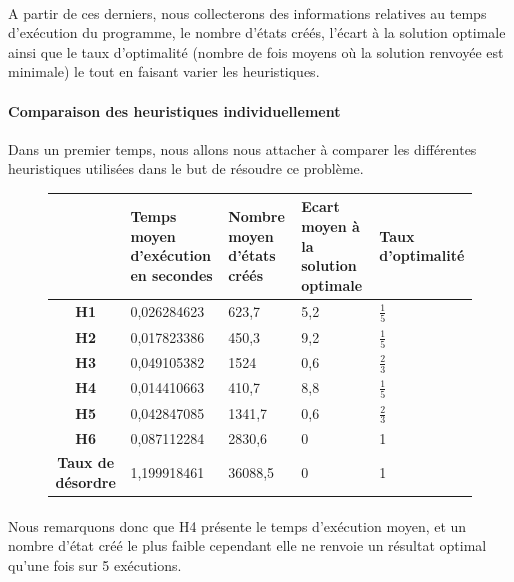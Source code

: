 \documentclass[10pt,a4paper]{report}
\begin{document}
\paragraph{}{A partir de ces derniers, nous collecterons des informations relatives au temps d'exécution du programme, le nombre d'états créés, l'écart à la solution optimale ainsi que le taux d'optimalité (nombre de fois moyens où la solution renvoyée est minimale) le tout en faisant varier les heuristiques.}
\paragraph{Comparaison des heuristiques individuellement}{Dans un premier temps, nous allons nous attacher à comparer les différentes heuristiques utilisées dans le but de résoudre ce problème.}
{\scriptsize{}
\renewcommand{\arraystretch}{1.3}
\vspace*{1cm}
\begin{figure}[h!]
\centering
\begin{tabular}
{| c || p{} | p{3cm} | p{3cm} | p{3cm} |} \hline \textbf{ } & \textbf{Temps moyen d'exécution en secondes }&
 \textbf{Nombre moyen d'états créés} & \textbf{Ecart moyen à la solution optimale} &
  \textbf{Taux d'optimalité} \\ \hline \hline
\textbf{H1} & 0,026284623 & 623,7 & 5,2 & $\frac{1}{5}$ \\ \hline
\textbf{H2} & 0,017823386 & 450,3 & 9,2 & $\frac{1}{5}$   \\ \hline
\textbf{H3}& 0,049105382 & 1524 & 0,6 & $\frac{2}{3}$ \\ \hline
\textbf{H4} & 0,014410663 & 410,7 & 8,8 & $\frac{1}{5}$ \\ \hline
\textbf{H5} & 0,042847085 & 1341,7 & 0,6 & $\frac{2}{3}$  \\ \hline
\textbf{H6} & 0,087112284 & 2830,6 & 0 & 1  \\ \hline
\textbf{Taux de désordre} & 1,199918461 & 36088,5 & 0& 1 \\ \hline
\end{tabular}

\end{figure} \vspace*{1cm}}
\paragraph{}{Nous remarquons donc que H4 présente le temps d'exécution moyen, et un nombre d'état créé le plus faible cependant elle ne renvoie un résultat optimal qu'une fois sur 5 exécutions.}
\end{document}
